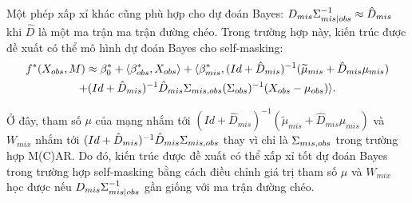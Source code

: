 Một phép xấp xỉ khác cũng phù hợp cho dự đoán Bayes: $D_{mis} \Sigma_{mis|obs}^{-1} \approx \hat{D}_{mis}$ khi $\hat{D}$ là một ma trận ma trận đường chéo. Trong trường hợp này, kiến trúc được đề xuất có thể mô hình dự đoán Bayes cho self-masking:
\begin{multline*}
    f^*(X_{obs}, M) 
    \approx \beta_0^* + \langle \beta_{obs}^*, X_{obs}\rangle + \langle \beta_{mis}^*, 
    (Id + \hat{D}_{mis})^{-1} (\widetilde{\mu}_{mis} + \hat{D}_{mis} \mu_{mis}) \\
    + (Id + \hat{D}_{mis})^{-1} \hat{D}_{mis} \Sigma_{mis,obs} (\Sigma_{obs})^{-1} (X_{obs} - \mu_{obs}) \rangle.
\end{multline*}

Ở đây, tham số $\mu$ của mạng nhắm tới $(Id + \hat{D}_{mis})^{-1} (\widetilde{\mu}_{mis} + \hat{D}_{mis} \mu_{mis})$ và $W_{mix}$ nhắm tới $(Id + \hat{D}_{mis})^{-1} \hat{D}_{mis} \Sigma_{mis,obs}$ thay vì chỉ là $\Sigma_{mis,obs}$ trong trường hợp M(C)AR. Do đó, kiến trúc được đề xuất có thể xấp xỉ tốt dự đoán Bayes trong trường hợp self-masking bằng cách điều chỉnh giá trị tham số $\mu$ và $W_{mix}$ học được nếu $D_{mis} \Sigma_{mis|obs}^{-1}$ gần giống với ma trận đường chéo.







